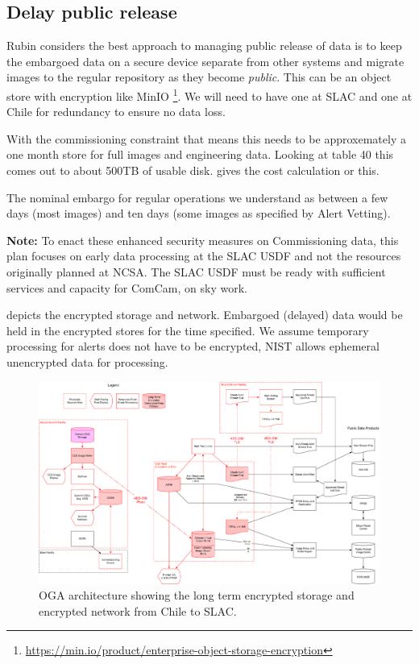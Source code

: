 
\subsection{Delay public release} \label{sec:3delay}

Rubin considers the best approach to managing public release of data is to keep the embargoed data on a secure device separate from other systems and migrate images to the regular repository as they become \emph{public}.
This can be an object store with encryption like MinIO \footnote{\url{ https://min.io/product/enterprise-object-storage-encryption}}.
We will need to have one at SLAC and one at Chile for redundancy to ensure no data loss.

With the commissioning constraint that means this needs to be approxemately a one month store  for full images and engineering data.
Looking at 
table 40 this comes out to about 500TB of usable disk.
 gives the cost calculation or this.

The nominal embargo for regular operations we understand as between a few days (most images) and ten days (some images as specified by Alert Vetting).




{\bf Note:} To enact these enhanced security measures on Commissioning data, this plan focuses on early data processing at the SLAC USDF and not the resources originally planned at NCSA. The SLAC USDF must be ready with sufficient services and capacity for ComCam, on sky work.

 depicts the encrypted storage and network. Embargoed (delayed) data would be held in the encrypted stores for the time specified.
We assume temporary processing for alerts does not have to be encrypted, NIST allows ephemeral unencrypted data for processing.

\begin{figure}
\begin{centering}
\includegraphics[width=\textwidth]{OGA_Diagram}
	\caption{ OGA architecture  showing the long term encrypted storage and encrypted network from Chile to SLAC. \label{fig:arch}}
\end{centering}
\end{figure}
